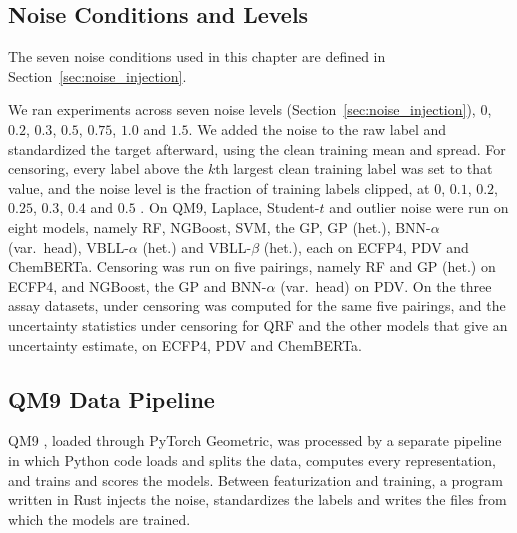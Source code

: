 \subsection{Noise Conditions and Levels}
The seven noise conditions used in this chapter are defined in Section~\ref{sec:noise_injection}.

We ran experiments across seven noise levels (Section~\ref{sec:noise_injection}), $0$, $0.2$, $0.3$, $0.5$, $0.75$, $1.0$ and $1.5$. We added the noise to the raw label and standardized the target afterward, using the clean training mean and spread. For censoring, every label above the $k$th largest clean training label was set to that value, and the noise level is the fraction of training labels clipped, at $0$, $0.1$, $0.2$, $0.25$, $0.3$, $0.4$ and $0.5$ \citep{Svensson2025}.
On QM9, Laplace, Student-$t$ and outlier noise were run on eight models, namely RF, NGBoost, SVM, the GP, GP (het.), BNN-$\alpha$ (var.\ head), VBLL-$\alpha$ (het.) and VBLL-$\beta$ (het.), each on ECFP4, PDV and ChemBERTa. Censoring was run on five pairings, namely RF and GP (het.) on ECFP4, and NGBoost, the GP and BNN-$\alpha$ (var.\ head) on PDV. On the three assay datasets, \aucnorm{} under censoring was computed for the same five pairings, and the uncertainty statistics under censoring for QRF and the other models that give an uncertainty estimate, on ECFP4, PDV and ChemBERTa.


\subsection{QM9 Data Pipeline}

QM9 \citep{Ramakrishnan2014}, loaded through PyTorch Geometric, was processed by a separate pipeline
in which Python code loads and splits the data, computes every representation, and trains and scores
the models. Between featurization and training, a program written in Rust injects the noise,
standardizes the labels and writes the files from which the models are trained.

